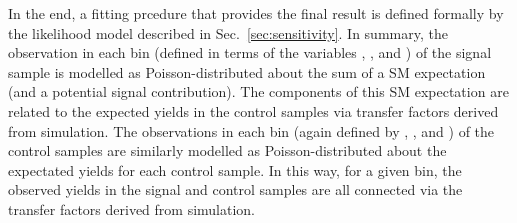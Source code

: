 In the end, a fitting prcedure that provides the final result is defined formally by the likelihood model described in Sec.~\ref{sec:sensitivity}. In summary, the observation in each bin (defined in terms of the variables \njet, \nb, and \scalht) of the signal sample is modelled as Poisson-distributed about the sum of a SM expectation (and a potential signal contribution). The components of this SM expectation are related to the expected yields in the control samples via transfer factors derived from simulation. The observations in each bin (again defined by \njet, \nb, and \scalht) of the control samples are similarly modelled as Poisson-distributed about the expectated yields for each control sample. In this way, for a given bin, the observed yields in the signal and control samples are all connected via the transfer factors derived from simulation.


